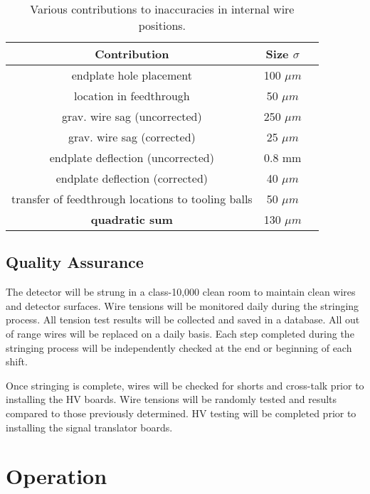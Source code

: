 \documentclass[12pt]{article}
\def\microns{$\mu m $ }
\begin{document}
\begin{table}[htbp]
\begin{center}
\begin{tabular} {||c|c|c||} \hline \hline
{\bf Contribution}      &  {\bf Size $\sigma$ } \\ \hline
endplate hole placement   & 100 \microns \\ \hline
location in feedthrough & 50 \microns \\ \hline
grav. wire sag (uncorrected) & 250 \microns \\ \hline
grav. wire sag (corrected) & 25 \microns \\ \hline
endplate deflection (uncorrected) & 0.8 mm \\ \hline
endplate deflection (corrected) & 40 \microns \\ \hline
transfer of feedthrough locations to tooling balls & 50 \microns \\ \hline
{\bf quadratic sum} & 130 \microns \\ \hline \hline
\end{tabular}
\caption{\small{Various contributions to inaccuracies in internal wire positions.}}
\label{errorbudget}
\end{center}
\end{table}

\subsection{Quality Assurance}

The detector will be strung in a class-10,000 clean room to maintain 
clean wires and detector surfaces. Wire tensions will be monitored daily 
during the stringing process. All tension test results will be collected 
and saved in a database. All out of range wires will be replaced on a 
daily basis.  Each step completed during the stringing process will be 
independently checked at the end or beginning of each shift.

Once stringing is complete, wires will be checked for shorts and cross-talk 
prior to installing the HV boards. Wire tensions will be randomly tested and 
results compared to those previously determined. HV testing will be 
completed prior to installing the signal translator boards.


\section{Operation}
\end{document}
